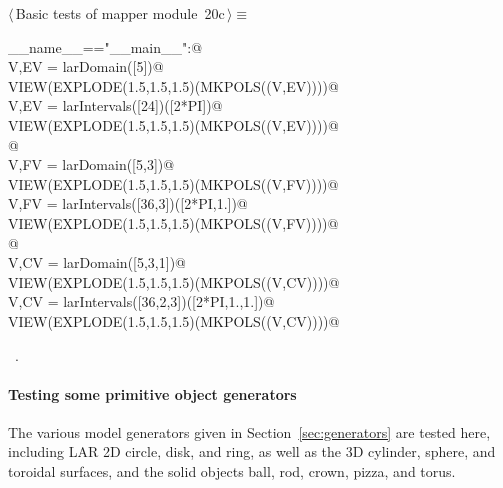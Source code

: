 \documentclass[11pt,oneside]{article}	%
\begin{document}
\begin{flushleft} \small \label{scrap39}
\protect{}$\langle\,$Basic tests of mapper module\nobreak\ {\footnotesize 20c}$\,\rangle\equiv$
\vspace{-1ex}
\begin{list}{}{} \item
\mbox{}\verb@if __name__=="__main__":@\\
\mbox{}\verb@   V,EV = larDomain([5])@\\
\mbox{}\verb@   VIEW(EXPLODE(1.5,1.5,1.5)(MKPOLS((V,EV))))@\\
\mbox{}\verb@   V,EV = larIntervals([24])([2*PI])@\\
\mbox{}\verb@   VIEW(EXPLODE(1.5,1.5,1.5)(MKPOLS((V,EV))))@\\
\mbox{}\verb@      @\\
\mbox{}\verb@   V,FV = larDomain([5,3])@\\
\mbox{}\verb@   VIEW(EXPLODE(1.5,1.5,1.5)(MKPOLS((V,FV))))@\\
\mbox{}\verb@   V,FV = larIntervals([36,3])([2*PI,1.])@\\
\mbox{}\verb@   VIEW(EXPLODE(1.5,1.5,1.5)(MKPOLS((V,FV))))@\\
\mbox{}\verb@      @\\
\mbox{}\verb@   V,CV = larDomain([5,3,1])@\\
\mbox{}\verb@   VIEW(EXPLODE(1.5,1.5,1.5)(MKPOLS((V,CV))))@\\
\mbox{}\verb@   V,CV = larIntervals([36,2,3])([2*PI,1.,1.])@\\
\mbox{}\verb@   VIEW(EXPLODE(1.5,1.5,1.5)(MKPOLS((V,CV))))@\\
\mbox{}\verb@@{\NWsep}
\end{list}
\vspace{-1ex}
\footnotesize\addtolength{\baselineskip}{-1ex}
\begin{list}{}{\setlength{\itemsep}{-\parsep}\setlength{\itemindent}{-\leftmargin}}
\item \NWtxtMacroRefIn\ .
\end{list}
\end{flushleft}

\paragraph{Testing some primitive object generators}
The various model generators given in Section~\ref{sec:generators} are tested here, including LAR 2D circle, disk, and ring, as well as the 3D cylinder, sphere, and toroidal surfaces, and the solid objects ball, rod, crown, pizza, and torus.
\end{document}
